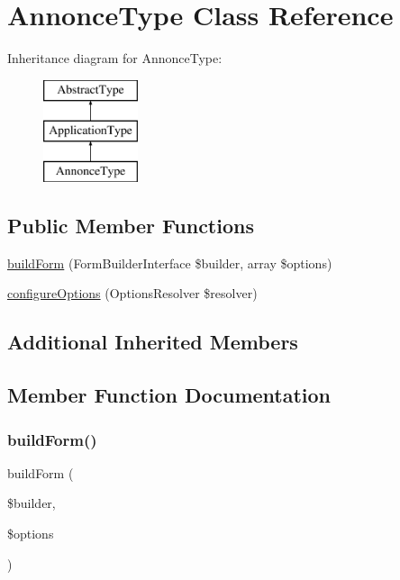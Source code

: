 \hypertarget{class_app_1_1_form_1_1_annonce_type}{}\section{Annonce\+Type Class Reference}
\label{class_app_1_1_form_1_1_annonce_type}
Inheritance diagram for Annonce\+Type\+:\begin{figure}[H]
\begin{center}
\leavevmode
\includegraphics[height=3.000000cm]{class_app_1_1_form_1_1_annonce_type}
\end{center}
\end{figure}
\subsection*{Public Member Functions}
\begin{DoxyCompactItemize}
\item 
\mbox{\hyperlink{class_app_1_1_form_1_1_annonce_type_a83c3745710374f9c5a1eb0686fe2dfab}{build\+Form}} (Form\+Builder\+Interface \$builder, array \$options)
\item 
\mbox{\hyperlink{class_app_1_1_form_1_1_annonce_type_a8ff68a86f5090b5df973286836e46ead}{configure\+Options}} (Options\+Resolver \$resolver)
\end{DoxyCompactItemize}
\subsection*{Additional Inherited Members}


\subsection{Member Function Documentation}
\mbox{\label{class_app_1_1_form_1_1_annonce_type_a83c3745710374f9c5a1eb0686fe2dfab}} 
\subsubsection{\texorpdfstring{buildForm()}{buildForm()}}
{\footnotesize\ttfamily build\+Form (\begin{DoxyParamCaption}\item[{Form\+Builder\+Interface}]{\$builder,  }\item[{array}]{\$options }\end{DoxyParamCaption})}

